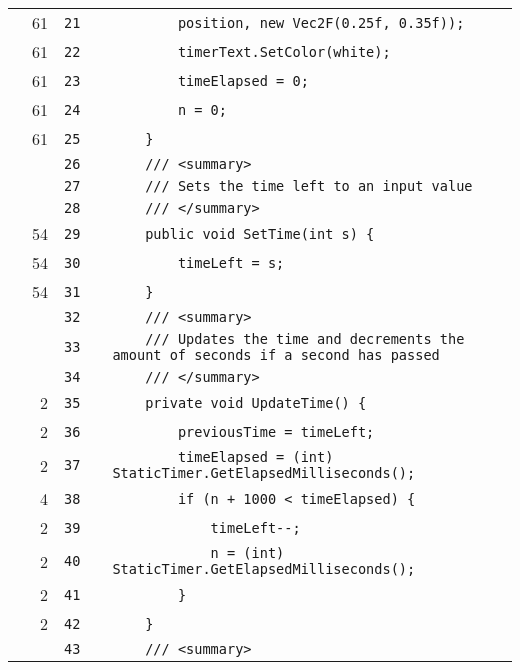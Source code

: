 \documentclass[a4paper,landscape,10pt]{article}
\begin{document}
\begin{longtable}[l]{lrrll}
\cellcolor{green} & 61 & \verb~21~ & & \verb~        position, new Vec2F(0.25f, 0.35f));~\\
\cellcolor{green} & 61 & \verb~22~ & & \verb~        timerText.SetColor(white);~\\
\cellcolor{green} & 61 & \verb~23~ & & \verb~        timeElapsed = 0;~\\
\cellcolor{green} & 61 & \verb~24~ & & \verb~        n = 0;~\\
\cellcolor{green} & 61 & \verb~25~ & & \verb~    }~\\
\cellcolor{gray} &  & \verb~26~ & & \verb~    /// <summary>~\\
\cellcolor{gray} &  & \verb~27~ & & \verb~    /// Sets the time left to an input value~\\
\cellcolor{gray} &  & \verb~28~ & & \verb~    /// </summary>~\\
\cellcolor{green} & 54 & \verb~29~ & & \verb~    public void SetTime(int s) {~\\
\cellcolor{green} & 54 & \verb~30~ & & \verb~        timeLeft = s;~\\
\cellcolor{green} & 54 & \verb~31~ & & \verb~    }~\\
\cellcolor{gray} &  & \verb~32~ & & \verb~    /// <summary>~\\
\cellcolor{gray} &  & \verb~33~ & & \verb~    /// Updates the time and decrements the amount of seconds if a second has passed~\\
\cellcolor{gray} &  & \verb~34~ & & \verb~    /// </summary>~\\
\cellcolor{green} & 2 & \verb~35~ & & \verb~    private void UpdateTime() {~\\
\cellcolor{green} & 2 & \verb~36~ & & \verb~        previousTime = timeLeft;~\\
\cellcolor{green} & 2 & \verb~37~ & & \verb~        timeElapsed = (int) StaticTimer.GetElapsedMilliseconds();~\\
\cellcolor{green} & 4 & \verb~38~ & & \verb~        if (n + 1000 < timeElapsed) {~\\
\cellcolor{green} & 2 & \verb~39~ & & \verb~            timeLeft--;~\\
\cellcolor{green} & 2 & \verb~40~ & & \verb~            n = (int) StaticTimer.GetElapsedMilliseconds();~\\
\cellcolor{green} & 2 & \verb~41~ & & \verb~        }~\\
\cellcolor{green} & 2 & \verb~42~ & & \verb~    }~\\
\cellcolor{gray} &  & \verb~43~ & & \verb~    /// <summary>~\\

\end{longtable}
\end{document}
